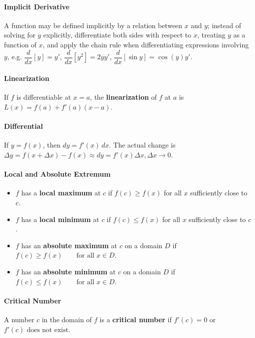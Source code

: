 \documentclass[oneside]{book}
\begin{document}
\paragraph{Implicit Derivative}{
    A function may be defined implicitly by a relation between $x$ and $y$; instead of solving for $y$ explicitly, differentiate both sides with respect to $x$, treating $y$ as a function of $x$, and apply the chain rule when differentiating expressions involving $y$, e.g. $\dfrac{d}{dx}[y]=y'$, $\dfrac{d}{dx}[y^2]=2yy'$, $\dfrac{d}{dx}[\sin y]=\cos(y)y'$.    
}

\paragraph{Linearization}{
If $f$ is differentiable at $x=a$, the \textbf{linearization} of $f$ at $a$ is
$L(x)=f(a)+f'(a)(x-a)$.
}

\paragraph{Differential}{
If $y=f(x)$, then $dy=f'(x)\,dx$. The actual change is
$\Delta y=f(x+\Delta x)-f(x) \approx dy=f'(x)\Delta x, \Delta x \rightarrow 0$. 
}


\paragraph{Local and Absolute Extremum}{
    \begin{itemize}
        \item $f$ has a \textbf{local maximum} at $c$ if $f(c)\ge f(x)$ for all $x$ sufficiently close to $c$. 
        \item $f$ has a \textbf{local minimum} at $c$ if $f(c)\le f(x)$ for all $x$ sufficiently close to $c$. 
        \item $f$ has an \textbf{absolute maximum} at $c$ on a domain $D$ if $f(c)\ge f(x)\qquad \text{for all }x\in D$.
        \item $f$ has an \textbf{absolute minimum} at $c$ on a domain $D$ if $f(c)\le f(x)\qquad \text{for all }x\in D$. 
    \end{itemize}
}

\paragraph{Critical Number}{
A number $c$ in the domain of $f$ is a \textbf{critical number} if $f'(c)=0$ or $f'(c)\text{ does not exist}$. 
}
\end{document}
